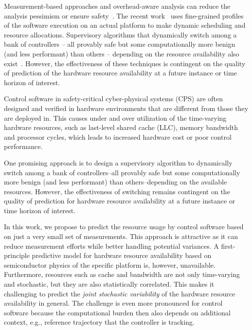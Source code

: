 \documentclass[letterpaper, 10pt, twocolumn]{ieeeconf}      %
\begin{document}
Measurement-based approaches and overhead-aware analysis can  reduce the analysis pessimism or ensure safety~\cite{Mingsong2009}. The recent work~\cite{gifford2021dna} uses fine-grained profiles of the software execution on an actual platform to make dynamic scheduling and resource allocations. Supervisory algorithms that dynamically switch among a bank of controllers -- all provably safe but some computationally more benign (and less performant) than others -- depending on the resource availability also exist~\cite{Zhang2016}. However, the effectiveness of these techniques is contingent on the quality of prediction of the hardware resource availability at a future instance or time horizon of interest.


\noindent Control software in safety-critical cyber-physical systems (CPS) are often designed and verified in hardware environments that are different from those they are deployed in. This causes under and over utilization of the time-varying hardware resources, such as last-level shared cache (LLC), memory bandwidth and processor cycles, which leads to increased hardware cost or poor control performance.  


One promising approach is to design a supervisory algorithm to dynamically switch among a bank of controllers--all provably safe but some computationally more benign (and less performant) than others--depending on the available resources. However, the effectiveness of switching remains contingent on the quality of prediction for hardware resource availability at a future instance or time horizon of interest.   
\fi 

In this work, we propose to predict the resource usage by control software based on just a very small set of measurements. This approach is attractive as it can reduce measurement efforts while better handling potential variances. A first-principle predictive model for hardware resource availability based on semiconductor physics of the specific platform is, however, unavailable. Furthermore, resources such as cache and bandwidth are not only time-varying and stochastic, but they are also statistically correlated. This makes it challenging to predict the \emph{joint stochastic variability} of the hardware resource availability in general. The challenge is even more pronounced for control software because the computational burden then also depends on additional context, e.g., reference trajectory that the controller is tracking. 
\end{document}
